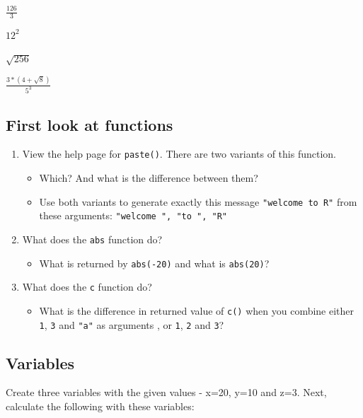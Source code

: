 \documentclass[]{book}
\providecommand{\tightlist}{%
  \setlength{\itemsep}{0pt}\setlength{\parskip}{0pt}}
\begin{document}
\(\frac{126}{3}\)

\(12^2\)

\(\sqrt{256}\)

\(\frac{3*(4+\sqrt{8})}{5^3}\)

\hypertarget{first-look-at-functions}{%
\subsection{First look at functions}\label{first-look-at-functions}}

\begin{enumerate}
\def\labelenumi{\arabic{enumi}.}
\tightlist
\item
  View the help page for \texttt{paste()}. There are two variants of this function.

  \begin{itemize}
  \tightlist
  \item
    Which? And what is the difference between them?
  \item
    Use both variants to generate exactly this message \texttt{"welcome\ to\ R"} from these arguments: \texttt{"welcome\ ",\ "to\ ",\ "R"}
  \end{itemize}
\item
  What does the \texttt{abs} function do?

  \begin{itemize}
  \tightlist
  \item
    What is returned by \texttt{abs(-20)} and what is \texttt{abs(20)}?\\
  \end{itemize}
\item
  What does the \texttt{c} function do?

  \begin{itemize}
  \tightlist
  \item
    What is the difference in returned value of \texttt{c()} when you combine either \texttt{1}, \texttt{3} and \texttt{"a"} as arguments , or \texttt{1}, \texttt{2} and \texttt{3}?
  \end{itemize}
\end{enumerate}

\hypertarget{variables-1}{%
\subsection{Variables}\label{variables-1}}

Create three variables with the given values - x=20, y=10 and z=3. Next, calculate the following with these variables:
\end{document}

